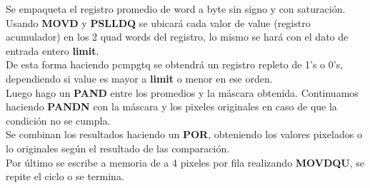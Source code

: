 Se empaqueta el registro promedio de word a byte sin signo y con saturación. \\
Usando \textbf{MOVD} y \textbf{PSLLDQ} se ubicará cada valor de value (registro acumulador) en los 2 quad words del registro, lo mismo se hará con el dato de entrada entero \textbf{limit}. \\
De esta forma haciendo pcmpgtq se obtendrá un registro repleto de 1's o 0's, dependiendo si value es mayor a \textbf{limit} o menor en ese orden. \\
Luego hago un \textbf{PAND} entre los promedios y la máscara obtenida. 
Continuamos haciendo \textbf{PANDN} con la máscara y los pixeles originales en caso de que la condición no se cumpla. \\
Se combinan los resultados haciendo un \textbf{POR}, obteniendo los valores pixelados o lo originales según el resultado de las comparación.\\
Por último se escribe a memoria de a 4 pixeles por fila realizando \textbf{MOVDQU}, se repite el ciclo o se termina.
